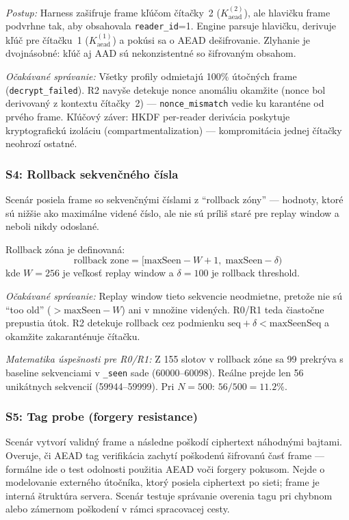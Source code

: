 \textit{Postup:} Harness zašifruje frame kľúčom čítačky~2 ($K_{\text{aead}}^{(2)}$), ale hlavičku frame podvrhne tak, aby obsahovala \texttt{reader\_id}=1. Engine parsuje hlavičku, derivuje kľúč pre čítačku~1 ($K_{\text{aead}}^{(1)}$) a pokúsi sa o AEAD dešifrovanie. Zlyhanie je dvojnásobné: kľúč aj AAD sú nekonzistentné so šifrovaným obsahom.

\textit{Očakávané správanie:} Všetky profily odmietajú 100\% útočných frame (\texttt{decrypt\_failed}). R2 navyše detekuje nonce anomáliu okamžite (nonce bol derivovaný z kontextu čítačky~2) --- \texttt{nonce\_mismatch} vedie ku karanténe od prvého frame. Kľúčový záver: HKDF per-reader derivácia poskytuje kryptografickú izoláciu (compartmentalization) --- kompromitácia jednej čítačky neohrozí ostatné.

\subsubsection{S4: Rollback sekvenčného čísla}

Scenár posiela frame so sekvenčnými číslami z ``rollback zóny'' --- hodnoty, ktoré sú nižšie ako maximálne videné číslo, ale nie sú príliš staré pre replay window a neboli nikdy odoslané.

Rollback zóna je definovaná:
\begin{equation}
\text{rollback zone} = [\text{maxSeen} - W + 1, \; \text{maxSeen} - \delta)
\end{equation}
kde $W = 256$ je veľkosť replay window a $\delta = 100$ je rollback threshold.

\textit{Očakávané správanie:} Replay window tieto sekvencie neodmietne, pretože nie sú ``too old'' ($> \text{maxSeen} - W$) ani v množine videných. R0/R1 teda čiastočne prepustia útok. R2 detekuje rollback cez podmienku $\text{seq} + \delta < \text{maxSeenSeq}$ a okamžite zakaranténuje čítačku.

\textit{Matematika úspešnosti pre R0/R1:} Z 155 slotov v rollback zóne sa 99 prekrýva s baseline sekvenciami v \texttt{\_seen} sade (60000--60098). Reálne prejde len 56 unikátnych sekvencií (59944--59999). Pri $N=500$: $56/500 = 11.2\%$.

\subsubsection{S5: Tag probe (forgery resistance)}

Scenár vytvorí validný frame a následne poškodí ciphertext náhodnými bajtami. Overuje, či AEAD tag verifikácia zachytí poškodenú šifrovanú časť frame --- formálne ide o test odolnosti použitia AEAD voči forgery pokusom\cite{RFC5116}. Nejde o modelovanie externého útočníka, ktorý posiela ciphertext po sieti; frame je interná štruktúra servera. Scenár testuje správanie overenia tagu pri chybnom alebo zámernom poškodení v rámci spracovacej cesty.

